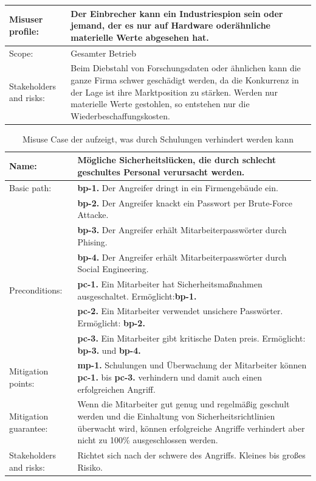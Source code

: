\begin{table}
\begin{tabular}{p{}p{}}
\hline 
Misuser profile: & Der Einbrecher kann ein Industriespion sein oder jemand, der es nur auf Hardware oderähnliche materielle Werte abgesehen hat. \\ 
\hline 
Scope: & Gesamter Betrieb \\
\hline 
Stakeholders and risks: &  Beim Diebstahl von Forschungsdaten oder ähnlichen kann die ganze Firma schwer geschädigt werden, da die Konkurrenz in der Lage ist ihre Marktposition zu stärken.
Werden nur materielle Werte gestohlen, so entstehen nur die Wiederbeschaffungskosten. \\ 
\hline
\end{tabular} 
\end{table}

\begin{table}
\scriptsize
\centering
\caption{Misuse Case der aufzeigt, was durch Schulungen verhindert werden kann}
\label{tab:MisuseCaseSchulung}
\begin{tabular}{p{}p{}}
\hline 
Name: & Mögliche Sicherheitslücken, die durch schlecht geschultes Personal verursacht werden. \\ 
\hline 
Basic path: & \textbf{bp-1.} Der Angreifer dringt in ein Firmengebäude ein.\\ 
& \textbf{bp-2.} Der Angreifer knackt ein Passwort per Brute-Force Attacke.\\ 
& \textbf{bp-3.} Der Angreifer erhält Mitarbeiterpasswörter durch Phising.\\ 
& \textbf{bp-4.} Der Angreifer erhält Mitarbeiterpasswörter durch Social Engineering.\\ 
\hline 
Preconditions: & \textbf{pc-1.} Ein Mitarbeiter hat Sicherheitsmaßnahmen ausgeschaltet. Ermöglicht:\textbf{bp-1.} \\
& \textbf{pc-2.} Ein Mitarbeiter verwendet unsichere Passwörter. Ermöglicht: \textbf{bp-2.}\\
& \textbf{pc-3.} Ein Mitarbeiter gibt kritische Daten preis. Ermöglicht: \textbf{bp-3.} und \textbf{bp-4.}\\
\hline 
Mitigation points: & \textbf{mp-1.} Schulungen und Überwachung der Mitarbeiter können \textbf{pc-1.} bis \textbf{pc-3.} verhindern und damit auch einen erfolgreichen Angriff.\\ 
\hline 
Mitigation guarantee: & Wenn die Mitarbeiter gut genug und regelmäßig geschult werden und die Einhaltung von Sicherheitsrichtlinien überwacht wird, können erfolgreiche Angriffe verhindert aber nicht zu 100\% ausgeschlossen werden. \\ 
\hline 
Stakeholders and risks: & Richtet sich nach der schwere des Angriffs. Kleines bis großes Risiko.  \\
\hline 
\end{tabular} 
\end{table}